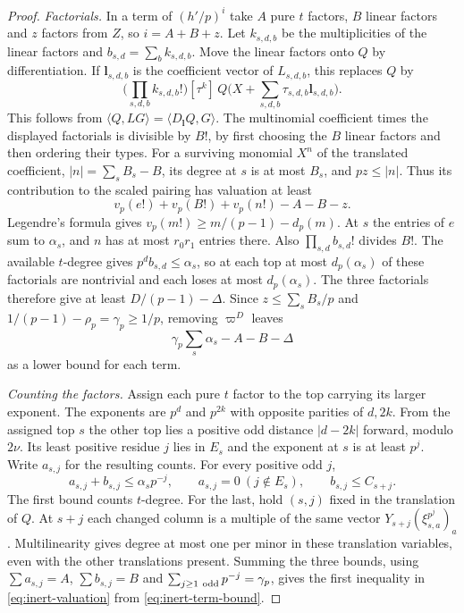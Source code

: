 \begin{proof}
\emph{Factorials.}
In a term of $(h'/p)^i$ take $A$ pure $t$ factors, $B$ linear factors
and $z$ factors from $Z$, so $i=A+B+z$. Let $k_{s,d,b}$ be the
multiplicities of the linear factors and $b_{s,d}=\sum_b k_{s,d,b}$.
Move the linear factors onto $Q$ by differentiation. If
$\mathbf l_{s,d,b}$ is the coefficient vector of $L_{s,d,b}$, this
replaces $Q$ by
\[
 \Big(\prod_{s,d,b}k_{s,d,b}!\Big)
 [\tau^k]\,Q\Big(X+\sum_{s,d,b}\tau_{s,d,b}\mathbf l_{s,d,b}\Big).
\]
This follows from $\langle Q,LG\rangle=\langle D_{\mathbf l}Q,G\rangle$.
The multinomial coefficient times the displayed factorials is divisible
by $B!$, by first choosing the $B$ linear factors and then ordering
their types. For a surviving monomial $X^n$ of the translated
coefficient, $|n|=\sum_s B_s-B$, its degree at $s$ is at most $B_s$,
and $pz\le |n|$. Thus its contribution to the scaled pairing has
valuation at least
\[
 v_p(e!)+v_p(B!)+v_p(n!)-A-B-z .
\]
Legendre's formula gives $v_p(m!)\ge m/(p-1)-d_p(m)$.
At $s$ the entries of $e$ sum to $\alpha_s$, and $n$ has at most
$r_0r_1$ entries there. Also $\prod_{s,d} b_{s,d}!$ divides $B!$.
The available $t$-degree gives $p^d b_{s,d}\le\alpha_s$, so at each
top at most $d_p(\alpha_s)$ of these factorials are nontrivial and
each loses at most $d_p(\alpha_s)$. The three factorials therefore
give at least $D/(p-1)-\Delta$. Since $z\le\sum_s B_s/p$ and
$1/(p-1)-\rho_p=\gamma_p\ge1/p$, removing $\varpi^D$ leaves
\begin{equation}\label{eq:inert-term-bound}
              \gamma_p\sum_s\alpha_s-A-B-\Delta
\end{equation}
as a lower bound for each term.

\emph{Counting the factors.}
Assign each pure $t$ factor to the top carrying its larger exponent.
The exponents are $p^d$ and $p^{2k}$ with opposite parities of $d,2k$.
From the assigned top $s$ the other top lies a positive odd distance
$|d-2k|$ forward, modulo $2\nu$. Its least positive residue $j$
lies in $E_s$ and the exponent at $s$ is at least $p^j$.
Write $a_{s,j}$ for the resulting counts. For every positive odd $j$,
\[
   a_{s,j}+b_{s,j}\le \alpha_s p^{-j},\qquad
   a_{s,j}=0\ (j\notin E_s),\qquad b_{s,j}\le C_{s+j}.
\]
The first bound counts $t$-degree. For the last, hold $(s,j)$ fixed in
the translation of $Q$. At $s+j$ each changed column is a multiple of
the same vector $Y_{s+j}(\xi_{s,a}^{p^j})_a$. Multilinearity gives
degree at most one per minor in these translation variables, even with
the other translations present. Summing the three bounds, using
$\sum a_{s,j}=A$, $\sum b_{s,j}=B$ and $\sum_{j\ge1\ {\rm odd}}p^{-j}
=\gamma_p$, gives the first inequality in \eqref{eq:inert-valuation}
from \eqref{eq:inert-term-bound}.


\end{proof}
